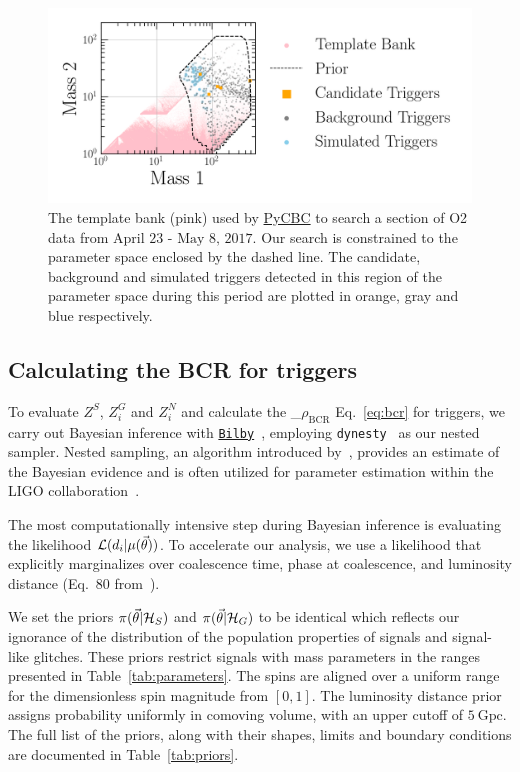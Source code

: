 \documentclass[%
 nofootinbib,
 amsmath,amssymb,
 aps,
 twocolumn,
 superscriptaddress
]{revtex4-2}
\newcommand{\bilby}{{\sc \href{https://lscsoft.docs.ligo.org/bilby/}{\texttt{Bilby}}}\xspace}
\newcommand{\dynesty}{{\sc \texttt{dynesty}}\xspace}
\newcommand{\pycbc}{{\sc \href{https://pycbc.org/}{{PyCBC}}}\xspace}
\newcommand{\mathcmd}[1]{{\sc \relax\ifmmode#1\else $#1$\fi}\xspace}
\newcommand{\bcr}{\mathcmd{\rho_\text{BCR}}}
\newcommand{\parameters}{\mathcmd{\vec{\theta}}}
\newcommand{\template}{\mathcmd{\mu(\parameters)}}
\begin{document}
\begin{figure}[!ht]

{\centering \includegraphics[width=0.75\linewidth]{images/template_bank.png}

}
\caption[ BCR search space.]{The template bank (pink) used by \pycbc to search a section of O2 data from $\text{April 23 - May 8, 2017}$. Our search is constrained to the parameter space enclosed by the dashed line. The candidate, background and simulated triggers detected in this region of the parameter space during this period are plotted in orange, gray and blue respectively.}\label{fig:templateBank}
\end{figure}


\subsection{Calculating the BCR for triggers}
To evaluate $Z^S$, $Z^G_i$ and $Z^N_i$ and calculate the \bcr Eq.~\ref{eq:bcr} for triggers, we carry out Bayesian inference with \bilby~\cite{bilby, bilby_pipe}, employing \dynesty~\cite{dynesty} as our nested sampler. Nested sampling, an algorithm introduced by~\citet{skilling2004, skilling2006}, provides an estimate of the Bayesian evidence and is often utilized for parameter estimation within the LIGO collaboration~\cite{bilby, bilby_paper, pbilby_paper}.

The most computationally intensive step during Bayesian inference is evaluating the likelihood $\mathcal{L}(d_i|\template)$. To accelerate our analysis, we use a likelihood that explicitly marginalizes over coalescence time, phase at coalescence, and luminosity distance (Eq.~80 from~\citet{intro_to_gw_bayes}).

We set the priors $\pi(\parameters|\mathcal{H}_S)$ and $\pi(\parameters|\mathcal{H}_G)$ to be identical which reflects our ignorance of the distribution of the population properties of signals and signal-like glitches. These priors restrict signals with mass parameters in the ranges presented in Table~\ref{tab:parameters}. The spins are aligned over a uniform range for the dimensionless spin magnitude from $\left[0,1\right]$. The luminosity distance prior assigns probability uniformly in comoving volume, with an upper cutoff of $5\ \text{Gpc}$. The full list of the priors, along with their shapes, limits and boundary conditions are documented in Table~\ref{tab:priors}. 
\end{document}
